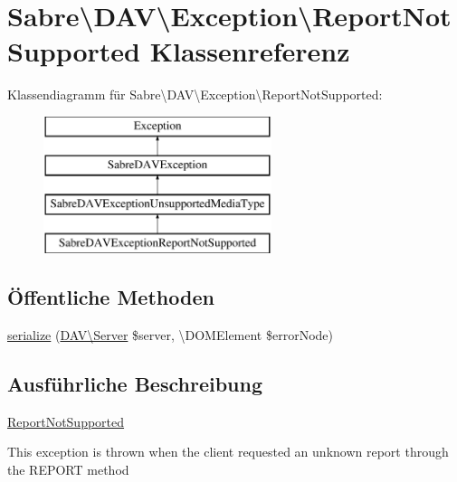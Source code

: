 \hypertarget{class_sabre_1_1_d_a_v_1_1_exception_1_1_report_not_supported}{}\section{Sabre\textbackslash{}D\+AV\textbackslash{}Exception\textbackslash{}Report\+Not\+Supported Klassenreferenz}
\label{class_sabre_1_1_d_a_v_1_1_exception_1_1_report_not_supported}
Klassendiagramm für Sabre\textbackslash{}D\+AV\textbackslash{}Exception\textbackslash{}Report\+Not\+Supported\+:\begin{figure}[H]
\begin{center}
\leavevmode
\includegraphics[height=4.000000cm]{class_sabre_1_1_d_a_v_1_1_exception_1_1_report_not_supported}
\end{center}
\end{figure}
\subsection*{Öffentliche Methoden}
\begin{DoxyCompactItemize}
\item 
\mbox{\hyperlink{class_sabre_1_1_d_a_v_1_1_exception_1_1_report_not_supported_af1ba39817026631e815ef0b24de17717}{serialize}} (\mbox{\hyperlink{class_sabre_1_1_d_a_v_1_1_server}{D\+A\+V\textbackslash{}\+Server}} \$server, \textbackslash{}D\+O\+M\+Element \$error\+Node)
\end{DoxyCompactItemize}


\subsection{Ausführliche Beschreibung}
\mbox{\hyperlink{class_sabre_1_1_d_a_v_1_1_exception_1_1_report_not_supported}{Report\+Not\+Supported}}

This exception is thrown when the client requested an unknown report through the R\+E\+P\+O\+RT method

